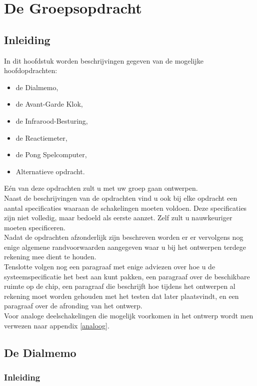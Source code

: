 \section{De Groepsopdracht}

\subsection{Inleiding}

In dit hoofdstuk worden beschrijvingen gegeven van de mogelijke
hoofdopdrachten:
\begin{itemize}
\item
de Dialmemo,
\item
de Avant-Garde Klok,
\item
de Infrarood-Besturing,
\item
de Reactiemeter,
\item
de Pong Spelcomputer,
\item
Alternatieve opdracht.
\end{itemize}
E\'en van deze opdrachten zult u met uw groep gaan ontwerpen.\\
Naast de beschrijvingen van de opdrachten vind u ook bij elke opdracht
een aantal specificaties waaraan de schakelingen moeten voldoen.
Deze specificaties zijn niet volledig, maar bedoeld als eerste aanzet.
Zelf zult u nauwkeuriger moeten specificeren. \\
Nadat de opdrachten afzonderlijk zijn beschreven worden er er vervolgens nog
enige algemene randvoorwaarden aangegeven waar u bij het ontwerpen terdege
rekening mee dient te houden.\\
Tenslotte volgen nog een paragraaf met enige
adviezen over hoe u de systeemspecificatie
het best aan kunt pakken, een paragraaf over de beschikbare ruimte
op de chip, een paragraaf die beschrijft hoe tijdens het ontwerpen
al rekening moet worden gehouden met het testen dat later plaatsvindt,
en een paragraaf
over de afronding van het ontwerp. \\
Voor analoge deelschakelingen die mogelijk voorkomen in 
het ontwerp wordt men verwezen naar appendix \ref{analoog}.

\subsection{De Dialmemo}

\subsubsection{Inleiding}

